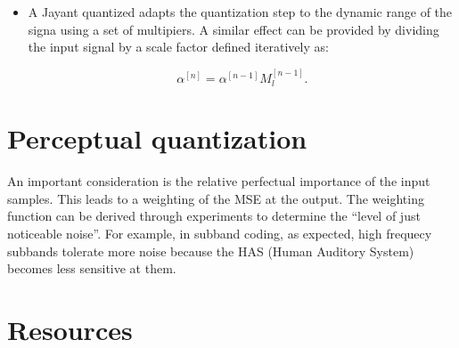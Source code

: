 \begin{itemize}
\item
  A Jayant quantized adapts the quantization step to the dynamic range
  of the signa using a set of multipiers. A similar effect can be
  provided by dividing the input signal by a scale factor defined
  iteratively as:

  \begin{equation}
    \alpha^{[n]} = \alpha^{[n-1]}M_l^{[n-1]}.
  \end{equation}
\end{itemize}


\section{Perceptual quantization}

An important consideration is the relative perfectual importance of
the input samples. This leads to a weighting of the MSE at the
output. The weighting function can be derived through experiments to
determine the ``level of just noticeable noise''. For example, in
subband coding, as expected, high frequecy subbands tolerate more
noise because the HAS (Human Auditory System) becomes less sensitive
at them.



\section{Resources}

